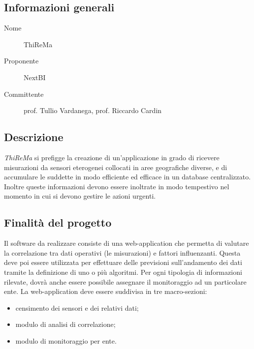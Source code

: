 \documentclass[../studio-di-fattibilita.tex]{subfiles}
\begin{document}
  \subsection{Informazioni generali}%
  \label{subsec:informazioni_generali}
  \begin{description}
    \item[Nome] ThiReMa
    \item[Proponente] NextBI
    \item[Committente] prof. Tullio Vardanega, prof. Riccardo Cardin
  \end{description}

  \subsection{Descrizione}%
  \label{subsec:descrizione}
  \textit{ThiReMa} si prefigge la creazione di un'applicazione in grado di ricevere misurazioni da sensori eterogenei collocati in aree geografiche diverse, e di accumulare le suddette in modo efficiente ed efficace in un database centralizzato. Inoltre queste informazioni devono essere inoltrate in modo tempestivo nel momento in cui si devono gestire le azioni urgenti.

  \subsection{Finalità del progetto}%
  \label{subsec:finalita_del_progetto}
  Il software da realizzare consiste di una web-application che permetta di valutare la correlazione tra dati operativi (le misurazioni) e fattori influenzanti.
  Questa deve poi essere utilizzata per effettuare delle previsioni sull'andamento dei dati tramite la definizione di uno o più algoritmi.
  Per ogni tipologia di informazioni rilevate, dovrà anche essere possibile assegnare il monitoraggio ad un particolare ente.
  La web-application deve essere suddivisa in tre macro-sezioni:
  \begin{itemize}
    \item censimento dei sensori e dei relativi dati;
    \item modulo di analisi di correlazione;
    \item modulo di monitoraggio per ente.
  \end{itemize}
\end{document}
